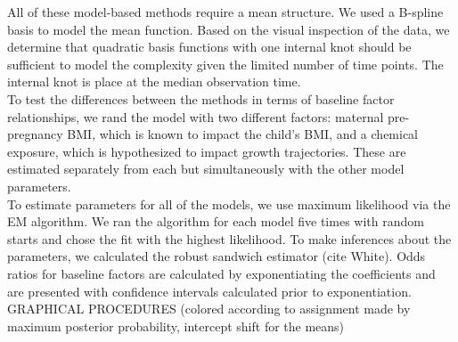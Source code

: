 \documentclass[11pt]{article}
\begin{document}
All of these model-based methods require a mean structure. We used a B-spline basis to model the mean function. Based on the visual inspection of the data, we determine that quadratic basis functions with one internal knot should be sufficient to model the complexity given the limited number of time points.  The internal knot is place at the median observation time. \\

To test the differences between the methods in terms of baseline factor relationships, we rand the model with two different factors: maternal pre-pregnancy BMI, which is known to impact the child's BMI, and a chemical exposure, which is hypothesized to impact growth trajectories. These are estimated separately from each but simultaneously with the other model parameters.\\

To estimate parameters for all of the models, we use maximum likelihood via the EM algorithm. We ran the algorithm for each model five times with random starts and chose the fit with the highest likelihood. To make inferences about the parameters, we calculated the robust sandwich estimator (cite White). Odds ratios for baseline factors are calculated by exponentiating the coefficients and are presented with confidence intervals calculated prior to exponentiation.\\

GRAPHICAL PROCEDURES (colored according to assignment made by maximum posterior probability, intercept shift for the means)\\
\end{document}

